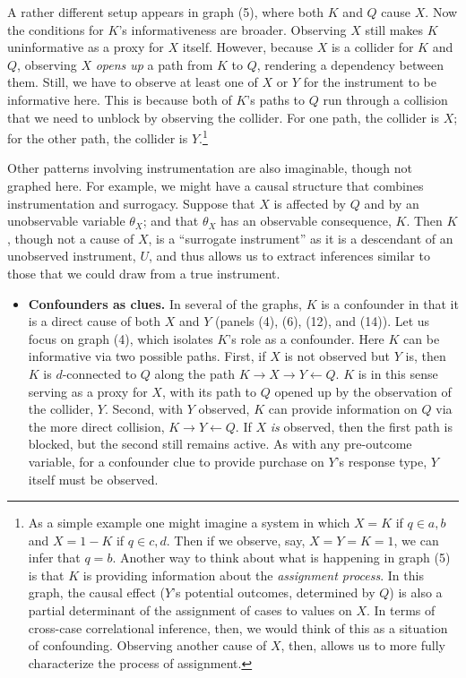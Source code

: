 \documentclass[
  12pt,
]{book}
\providecommand{\tightlist}{%
  \setlength{\itemsep}{0pt}\setlength{\parskip}{0pt}}
\begin{document}
A rather different setup appears in graph (5), where both \(K\) and \(Q\) cause \(X\). Now the conditions for \(K\)'s informativeness are broader. Observing \(X\) still makes \(K\) uninformative as a proxy for \(X\) itself. However, because \(X\) is a collider for \(K\) and \(Q\), observing \(X\) \emph{opens up} a path from \(K\) to \(Q\), rendering a dependency between them. Still, we have to observe at least one of \(X\) or \(Y\) for the instrument to be informative here. This is because both of \(K\)'s paths to \(Q\) run through a collision that we need to unblock by observing the collider. For one path, the collider is \(X\); for the other path, the collider is \(Y\).\footnote{As a simple example one might imagine a system in which \(X = K\) if \(q \in {a,b}\) and \(X = 1-K\) if \(q \in {c,d}\). Then if we observe, say, \(X=Y=K=1\), we can infer that \(q = b\). Another way to think about what is happening in graph (5) is that \(K\) is providing information about the \emph{assignment process}. In this graph, the causal effect (\(Y\)'s potential outcomes, determined by \(Q\)) is also a partial determinant of the assignment of cases to values on \(X\). In terms of cross-case correlational inference, then, we would think of this as a situation of confounding. Observing another cause of \(X\), then, allows us to more fully characterize the process of assignment.}

Other patterns involving instrumentation are also imaginable, though not graphed here. For example, we might have a causal structure that combines instrumentation and surrogacy. Suppose that \(X\) is affected by \(Q\) and by an unobservable variable \(\theta_X\); and that \(\theta_X\) has an observable consequence, \(K\). Then \(K\), though not a cause of \(X\), is a ``surrogate instrument'' \citep{hernan2006instruments} as it is a descendant of an unobserved instrument, \(U\), and thus allows us to extract inferences similar to those that we could draw from a true instrument.

\begin{itemize}
\tightlist
\item
  \textbf{Confounders as clues.} In several of the graphs, \(K\) is a confounder in that it is a direct cause of both \(X\) and \(Y\) (panels (4), (6), (12), and (14)). Let us focus on graph (4), which isolates \(K\)'s role as a confounder. Here \(K\) can be informative via two possible paths. First, if \(X\) is not observed but \(Y\) is, then \(K\) is \(d\)-connected to \(Q\) along the path \(K \rightarrow X \rightarrow Y \leftarrow Q\). \(K\) is in this sense serving as a proxy for \(X\), with its path to \(Q\) opened up by the observation of the collider, \(Y\). Second, with \(Y\) observed, \(K\) can provide information on \(Q\) via the more direct collision, \(K \rightarrow Y \leftarrow Q\). If \(X\) \emph{is} observed, then the first path is blocked, but the second still remains active. As with any pre-outcome variable, for a confounder clue to provide purchase on \(Y\)'s response type, \(Y\) itself must be observed.
\end{itemize}
\end{document}
